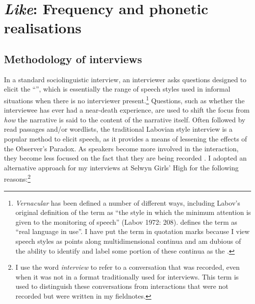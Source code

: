 \chapter{\textit{Like}: Frequency and phonetic realisations}
\label{ch:prod}
\date{}

\section{Methodology of interviews}\label{interview:method}

In a standard sociolinguistic interview, an interviewer asks questions designed to elicit the ``'', which is essentially the range of speech styles used in informal situations when there is no interviewer present.\footnote{\textit{Vernacular} has been defined a number of different ways, including Labov's original definition of the term as ``the style in which the minimum attention is given to the monitoring of speech'' (Labov 1972: 208).  \citet{milroy1992} defines the term as ``real language in use''. I have put the term in quotation marks because I view speech styles as points along multidimensional continua and am dubious of the ability to identify and label some portion of these continua as the .} Questions, such as whether the interviewee has ever had a near-death experience, are used to shift the focus from \textit{how} the narrative is said to the content of the narrative itself. Often followed by read passages and/or wordlists, the traditional Labovian style interview is a popular method to elicit speech, as it provides a means of lessening the effects of the Observer's Paradox. As speakers become more involved in the interaction, they become less focused on the fact that they are being recorded \citep{labov1972sociolingpatterns}. I adopted an alternative approach for my interviews at Selwyn Girls' High for the following reasons:\footnote{I use the word \textit{interview} to refer to a conversation that was recorded, even when it was not in a format traditionally used for interviews. This term is used to distinguish these conversations from interactions that were not recorded but were written in my fieldnotes.} 



